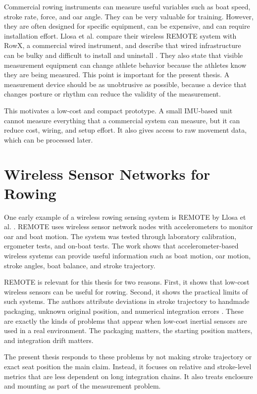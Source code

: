 Commercial rowing instruments can measure useful variables such as boat speed, stroke rate, force, and oar angle. They can be very valuable for training. However, they are often designed for specific equipment, can be expensive, and can require installation effort. Llosa et al. compare their wireless REMOTE system with RowX, a commercial wired instrument, and describe that wired infrastructure can be bulky and difficult to install and uninstall \cite{llosa_remote_2009}. They also state that visible measurement equipment can change athlete behavior because the athletes know they are being measured. This point is important for the present thesis. A measurement device should be as unobtrusive as possible, because a device that changes posture or rhythm can reduce the validity of the measurement.

This motivates a low-cost and compact prototype. A small IMU-based unit cannot measure everything that a commercial system can measure, but it can reduce cost, wiring, and setup effort. It also gives access to raw movement data, which can be processed later.

\section{Wireless Sensor Networks for Rowing}

One early example of a wireless rowing sensing system is REMOTE by Llosa et al. \cite{llosa_remote_2009}. REMOTE uses wireless sensor network nodes with accelerometers to monitor oar and boat motion. The system was tested through laboratory calibration, ergometer tests, and on-boat tests. The work shows that accelerometer-based wireless systems can provide useful information such as boat motion, oar motion, stroke angles, boat balance, and stroke trajectory.

REMOTE is relevant for this thesis for two reasons. First, it shows that low-cost wireless sensors can be useful for rowing. Second, it shows the practical limits of such systems. The authors attribute deviations in stroke trajectory to handmade packaging, unknown original position, and numerical integration errors \cite{llosa_remote_2009}. These are exactly the kinds of problems that appear when low-cost inertial sensors are used in a real environment. The packaging matters, the starting position matters, and integration drift matters.

The present thesis responds to these problems by not making stroke trajectory or exact seat position the main claim. Instead, it focuses on relative and stroke-level metrics that are less dependent on long integration chains. It also treats enclosure and mounting as part of the measurement problem.

